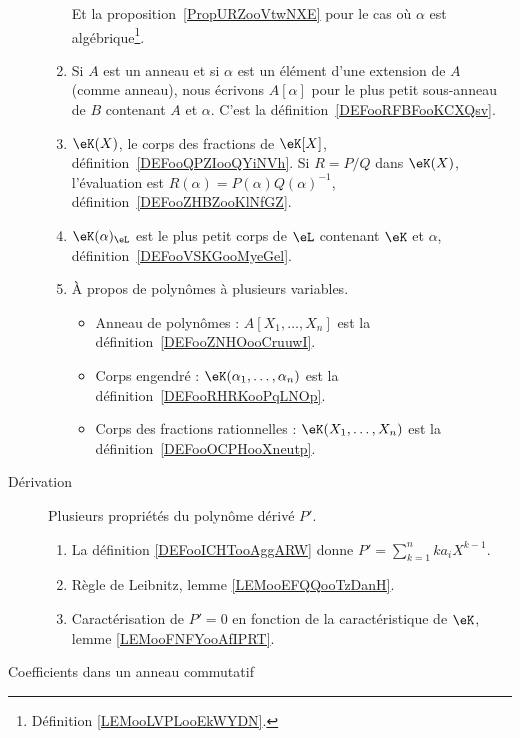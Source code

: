 \begin{description}
\begin{enumerate}
		            Et la proposition~\ref{PropURZooVtwNXE} pour le cas où \( \alpha\) est algébrique\footnote{Définition \ref{LEMooLVPLooEkWYDN}.}.
		      \item
		            Si \( A\) est un anneau et si \( \alpha\) est un élément d'une extension de \( A\) (comme anneau), nous écrivons \( A[\alpha]\) pour le plus petit sous-anneau de \( B\) contenant \( A\) et \( \alpha\). C'est la définition~\ref{DEFooRFBFooKCXQsv}.
		      \item
		            \( \eK(X)\), le corps des fractions de \( \eK[X]\), définition~\ref{DEFooQPZIooQYiNVh}. Si \( R=P/Q\) dans \( \eK(X)\), l'évaluation est \( R(\alpha)=P(\alpha)Q(\alpha)^{-1}\), définition~\ref{DEFooZHBZooKlNfGZ}.
		      \item
		            \( \eK(\alpha)_{\eL}\) est le plus petit corps de \( \eL\) contenant \( \eK\) et \( \alpha\), définition~\ref{DEFooVSKGooMyeGel}.
		      \item
		            À propos de polynômes à plusieurs variables.
		            \begin{itemize}
			            \item Anneau de polynômes : \( A[X_1,\ldots, X_n]\) est la définition~\ref{DEFooZNHOooCruuwI}.
			            \item Corps engendré : \( \eK(\alpha_1,\ldots, \alpha_n)\) est la définition~\ref{DEFooRHRKooPqLNOp}.
			            \item Corps des fractions rationnelles : \( \eK(X_1,\ldots, X_n)\) est la définition~\ref{DEFooOCPHooXneutp}.
		            \end{itemize}
	      \end{enumerate}

      \item[Dérivation]
          Plusieurs propriétés du polynôme dérivé \( P'\).
          \begin{enumerate}
              \item
                  La définition \ref{DEFooICHTooAggARW} donne \( P'=\sum_{k=1}^nka_iX^{k-1}\).
              \item
                  Règle de Leibnitz, lemme \ref{LEMooEFQQooTzDanH}.
              \item
                  Caractérisation de \( P'=0\) en fonction de la caractéristique de \( \eK\), lemme \ref{LEMooFNFYooAfIPRT}.
          \end{enumerate}

	\item[Coefficients dans un anneau commutatif]


\end{description}

